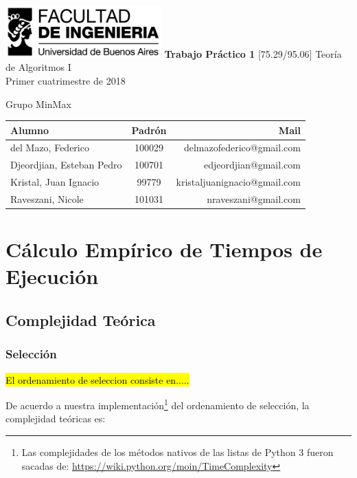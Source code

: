 \documentclass[article,a4paper]{article}
\begin{document}
\begin{titlepage}
	\hfill\includegraphics[width=6cm]{fiuba.jpg}
    \centering
    \vfill
    \Huge \textbf{Trabajo Práctico 1}
    \vskip2cm
    \Large [75.29/95.06] Teoría de Algoritmos I\\
    Primer cuatrimestre de 2018
    \vfill
    \begin{flushleft}
    Grupo MinMax
    \end{flushleft}
    \begin{tabular}{|l|c|r|}
	\hline
	Alumno & Padrón & Mail\\
	\hline
	\hline
	del Mazo, Federico & 100029 & delmazofederico@gmail.com\\
	\hline
    Djeordjian, Esteban Pedro & 100701 & edjeordjian@gmail.com\\	
	\hline
	Kristal, Juan Ignacio & 99779 & kristaljuanignacio@gmail.com\\
	\hline
    Raveszani, Nicole & 101031 & nraveszani@gmail.com\\
	\hline
	\end{tabular}
    \vfill
    \vfill
\end{titlepage}

\tableofcontents
\newpage
{}
\setcounter{page}{1}

\section{Cálculo Empírico de Tiempos de Ejecución}
\subsection{Complejidad Teórica}
\subsubsection{Selección}

\hl{El ordenamiento de seleccion consiste en.....}

De acuerdo a nuestra implementación\footnote{Las complejidades de los métodos nativos de las listas de Python 3 fueron sacadas de: \url{https://wiki.python.org/moin/TimeComplexity}} del ordenamiento de selección, la complejidad teóricas es:
\end{document}
